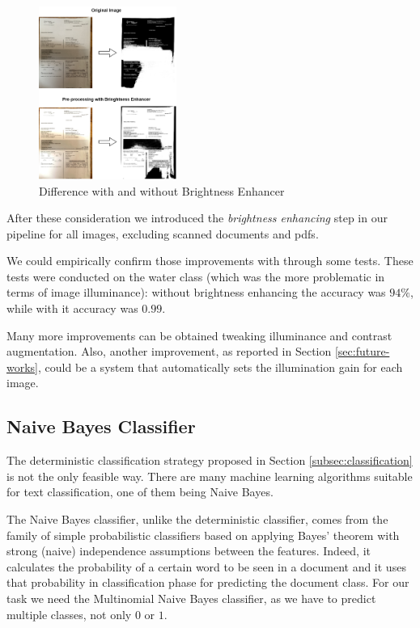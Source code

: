 \documentclass[10pt,twocolumn,letterpaper]{article}
\begin{document}
\begin{figure}[!ht]
  \centering
  \includegraphics[width=0.4\textwidth]{images/bright-contrast-experiment.png}
  \caption{Difference with and without Brightness Enhancer}
  \label{bright-constrast-experiment}
\end{figure}

After these consideration we introduced the \emph{brightness
  enhancing} step in our pipeline for all images, excluding scanned
documents and pdfs.

We could empirically confirm those improvements with through some
tests. These tests were conducted on the water class (which was the
more problematic in terms of image illuminance): without brightness
enhancing the accuracy was $94\%$, while with it accuracy was $0.99$.

Many more improvements can be obtained tweaking illuminance and
contrast augmentation. Also, another improvement, as reported in
Section \ref{sec:future-works}, could be a system that automatically
sets the illumination gain for each image.

\subsection{Naive Bayes Classifier}
\label{subsec:naive-bayes-classifier}

The deterministic classification strategy proposed in Section
\ref{subsec:classification} is not the only feasible way. There are
many machine learning algorithms suitable for text classification, one
of them being Naive Bayes.

The Naive Bayes classifier, unlike the deterministic classifier, comes
from the family of simple probabilistic classifiers based on applying
Bayes' theorem with strong (naive) independence assumptions between
the features. Indeed, it calculates the probability of a certain word
to be seen in a document and it uses that probability in
classification phase for predicting the document class. For our task
we need the Multinomial Naive Bayes classifier, as we have to predict
multiple classes, not only $0$ or $1$.
\end{document}
